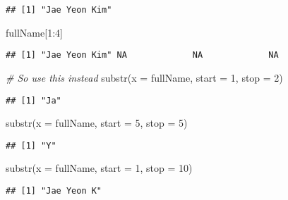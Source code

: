 \documentclass[
]{book}
\newenvironment{Shaded}{\begin{snugshade}}{\end{snugshade}}
\newcommand{\AttributeTok}[1]{\textcolor[rgb]{0.77,0.63,0.00}{#1}}
\newcommand{\CommentTok}[1]{\textcolor[rgb]{0.56,0.35,0.01}{\textit{#1}}}
\newcommand{\DecValTok}[1]{\textcolor[rgb]{0.00,0.00,0.81}{#1}}
\newcommand{\FunctionTok}[1]{\textcolor[rgb]{0.00,0.00,0.00}{#1}}
\newcommand{\NormalTok}[1]{#1}
\newcommand{\SpecialCharTok}[1]{\textcolor[rgb]{0.00,0.00,0.00}{#1}}
\begin{document}
\begin{verbatim}
## [1] "Jae Yeon Kim"
\end{verbatim}

\begin{Shaded}
\begin{Highlighting}[]
\NormalTok{fullName[}\DecValTok{1}\SpecialCharTok{:}\DecValTok{4}\NormalTok{]}
\end{Highlighting}
\end{Shaded}

\begin{verbatim}
## [1] "Jae Yeon Kim" NA             NA             NA
\end{verbatim}

\begin{Shaded}
\begin{Highlighting}[]
\CommentTok{\# So use this instead}
\FunctionTok{substr}\NormalTok{(}\AttributeTok{x =}\NormalTok{ fullName, }\AttributeTok{start =} \DecValTok{1}\NormalTok{, }\AttributeTok{stop =} \DecValTok{2}\NormalTok{)}
\end{Highlighting}
\end{Shaded}

\begin{verbatim}
## [1] "Ja"
\end{verbatim}

\begin{Shaded}
\begin{Highlighting}[]
\FunctionTok{substr}\NormalTok{(}\AttributeTok{x =}\NormalTok{ fullName, }\AttributeTok{start =} \DecValTok{5}\NormalTok{, }\AttributeTok{stop =} \DecValTok{5}\NormalTok{)}
\end{Highlighting}
\end{Shaded}

\begin{verbatim}
## [1] "Y"
\end{verbatim}

\begin{Shaded}
\begin{Highlighting}[]
\FunctionTok{substr}\NormalTok{(}\AttributeTok{x =}\NormalTok{ fullName, }\AttributeTok{start =} \DecValTok{1}\NormalTok{, }\AttributeTok{stop =} \DecValTok{10}\NormalTok{)}
\end{Highlighting}
\end{Shaded}

\begin{verbatim}
## [1] "Jae Yeon K"
\end{verbatim}
\end{document}
